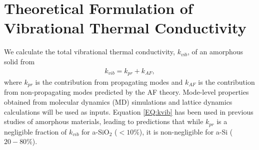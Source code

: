 \documentclass[aps,prb,onecolumn,preprint,superscriptaddress,footinbib,amsmath,amssymb,floatfix]{revtex4}
\begin{document}
\section{\label{S:Theory:Thermal}Theoretical Formulation of 
Vibrational Thermal Conductivity}

We calculate the total vibrational thermal conductivity, $k_{vib}$, 
of an amorphous solid from 
\begin{equation}\label{EQ:kvib}
\begin{split}
k_{vib} = k_{pr} + k_{AF},
\end{split}
\end{equation}
where $k_{pr}$ is the contribution from propagating modes
\cite{ashcroft_solid_1976,dove_introduction_1993,ziman_electrons_2001} 
and $k_{AF}$ is the contribution from non-propagating modes predicted 
by the AF theory.\cite{feldman_thermal_1993} Mode-level 
properties obtained from molecular dynamics (MD) simulations and 
lattice dynamics calculations will be used as inputs. 
Equation \eqref{EQ:kvib} has been used in 
previous studies of amorphous materials,
\cite{graebner_phonon_1986,freeman_thermal_1986,
love_estimate_1990,feldman_thermal_1993,cahill_thermal_1994,
feldman_numerical_1999,baldi_thermal_2008,
liu_high_2009,yang_anomalously_2010} 
leading to predictions that while $k_{pr}$ is a negligible 
fraction of $k_{vib}$ for a-SiO$_2$ ($< 10\%$),
\cite{graebner_phonon_1986,freeman_thermal_1986,
love_estimate_1990,baldi_thermal_2008} 
it is non-negligible 
for a-Si ($20-80\%$).
\cite{feldman_thermal_1993,cahill_thermal_1994,
feldman_numerical_1999,liu_high_2009,yang_anomalously_2010,
he_heat_2011}
\end{document}
